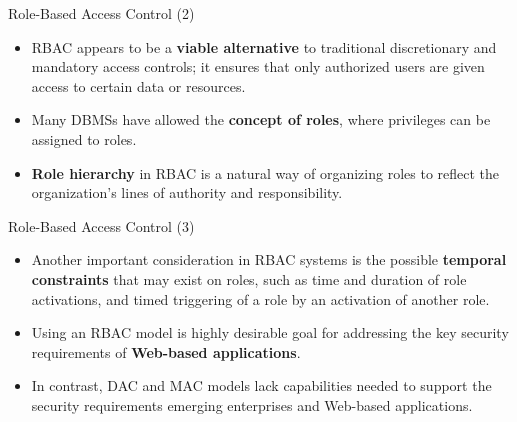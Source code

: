 \begin{frame}{Role-Based Access Control (2)}
    \Large
    \begin{itemize}
        \item RBAC appears to be a \textbf{viable alternative} to traditional discretionary and mandatory access controls; it ensures that only authorized users are given access to certain data or resources.
        
        \vspace{0.3cm}
        \item Many DBMSs have allowed the \textbf{concept of roles}, where privileges can be assigned to roles.
        
        \vspace{0.3cm}
        \item \textbf{Role hierarchy} in RBAC is a natural way of organizing roles to reflect the organization's lines of authority and responsibility.
    \end{itemize}
\end{frame}

\begin{frame}{Role-Based Access Control (3)}
    \Large
    \begin{itemize}
        \item Another important consideration in RBAC systems is the possible \textbf{temporal constraints} that may exist on roles, such as time and duration of role activations, and timed triggering of a role by an activation of another role.
        
        \vspace{0.3cm}
        \item Using an RBAC model is highly desirable goal for addressing the key security requirements of \textbf{Web-based applications}.
        
        \item In contrast, DAC and MAC models lack capabilities needed to support the security requirements emerging enterprises and Web-based applications.
    \end{itemize}
\end{frame}

